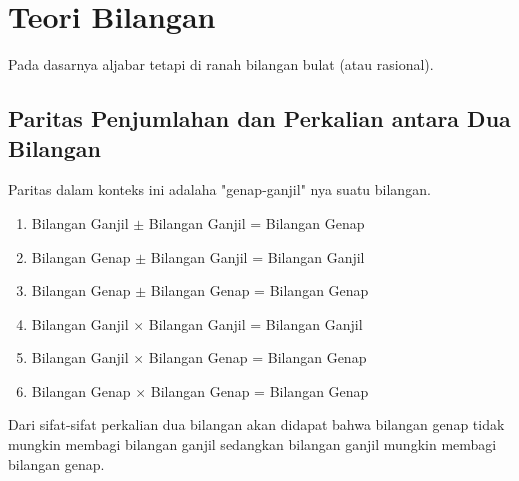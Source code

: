 \section{Teori Bilangan}
Pada dasarnya aljabar tetapi di ranah bilangan bulat (atau rasional).
\subsection{Paritas Penjumlahan dan Perkalian antara Dua Bilangan}
Paritas dalam konteks ini adalaha "genap-ganjil" nya suatu bilangan.
    \begin{enumerate}
        \item Bilangan Ganjil $\pm$ Bilangan Ganjil = Bilangan Genap 
        \item Bilangan Genap $\pm$ Bilangan Ganjil = Bilangan Ganjil 
        \item Bilangan Genap $\pm$ Bilangan Genap = Bilangan Genap 
        \item Bilangan Ganjil $\times$ Bilangan Ganjil = Bilangan Ganjil 
        \item Bilangan Ganjil $\times$ Bilangan Genap = Bilangan Genap 
        \item Bilangan Genap $\times$ Bilangan Genap = Bilangan Genap
    \end{enumerate}
    Dari sifat-sifat perkalian dua bilangan akan didapat bahwa bilangan genap tidak mungkin membagi bilangan ganjil sedangkan bilangan ganjil mungkin membagi bilangan genap. 


    

